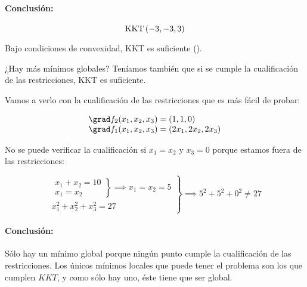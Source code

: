 \begin{problem}[3]
\paragraph{Conclusión:}

\[\mbox{KKT}\left(-3,-3,3\right)\]

\spart 

Bajo condiciones de convexidad, KKT es suficiente ().

¿Hay más mínimos globales?
Teníamos también que si se cumple la cualificación de las restricciones, KKT es suficiente.

Vamos a verlo con la cualificación de las restricciones que es más fácil de probar:

\[
	\begin{array}{l}
		\grad f_2(x_1,x_2,x_3) = (1,1,0)\\
		\grad f_1(x_1,x_2,x_3) = (2x_1,2x_2,2x_3)
	\end{array}
\]

No se puede verificar la cualificación si $x_1 = x_2$ y $x_3 = 0$ porque estamos fuera de las restricciones:

\[
\left.\begin{array}{l}
	\left.
	\begin{array}{r}
		x_1+x_2 = 10\\
		x_1=x_2
	\end{array}\right\}\implies x_1=x_2=5\\
	x_1^2+x_2^2+x_3^2 = 27
\end{array}
\right\}\implies 5^2+5^2+0^2 ≠ 27
\]

\paragraph{Conclusión:}

Sólo hay un mínimo global porque ningún punto cumple la cualificación de las restricciones. Los únicos mínimos locales que puede tener el problema son los que cumplen $KKT$, y como sólo hay uno, éste tiene que ser global.

\end{problem}